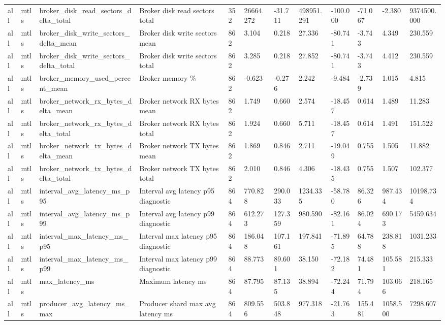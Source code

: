 \begin{longtable}{llllllllllll}
all & mtls & broker\_disk\_read\_sectors\_delta\_total & Broker disk read sectors total & 352 & 26664.272 & -31.711 & 498951.291 & -100.000 & -71.067 & -2.380 & 9374500.000 \\
all & mtls & broker\_disk\_write\_sectors\_delta\_mean & Broker disk write sectors mean & 862 & 3.104 & 0.218 & 27.336 & -80.741 & -3.743 & 4.349 & 230.559 \\
all & mtls & broker\_disk\_write\_sectors\_delta\_total & Broker disk write sectors total & 862 & 3.285 & 0.218 & 27.852 & -80.741 & -3.743 & 4.412 & 230.559 \\
all & mtls & broker\_memory\_used\_percent\_mean & Broker memory \% & 862 & -0.623 & -0.276 & 2.242 & -9.484 & -2.739 & 1.015 & 4.815 \\
all & mtls & broker\_network\_rx\_bytes\_delta\_mean & Broker network RX bytes mean & 862 & 1.749 & 0.660 & 2.574 & -18.457 & 0.614 & 1.489 & 11.283 \\
all & mtls & broker\_network\_rx\_bytes\_delta\_total & Broker network RX bytes total & 862 & 1.924 & 0.660 & 5.711 & -18.457 & 0.614 & 1.491 & 151.522 \\
all & mtls & broker\_network\_tx\_bytes\_delta\_mean & Broker network TX bytes mean & 862 & 1.869 & 0.846 & 2.711 & -19.049 & 0.755 & 1.505 & 11.882 \\
all & mtls & broker\_network\_tx\_bytes\_delta\_total & Broker network TX bytes total & 862 & 2.010 & 0.846 & 4.306 & -18.435 & 0.755 & 1.507 & 102.377 \\
all & mtls & interval\_avg\_latency\_ms\_p95 & Interval avg latency p95 diagnostic & 864 & 770.828 & 290.033 & 1234.335 & -58.780 & 86.326 & 987.434 & 10198.734 \\
all & mtls & interval\_avg\_latency\_ms\_p99 & Interval avg latency p99 diagnostic & 864 & 612.273 & 127.359 & 980.590 & -82.161 & 86.024 & 690.173 & 5459.634 \\
all & mtls & interval\_max\_latency\_ms\_p95 & Interval max latency p95 diagnostic & 864 & 186.048 & 107.161 & 197.841 & -71.895 & 64.788 & 238.818 & 1031.233 \\
all & mtls & interval\_max\_latency\_ms\_p99 & Interval max latency p99 diagnostic & 864 & 88.773 & 89.601 & 38.150 & -72.182 & 74.481 & 105.581 & 215.333 \\
all & mtls & max\_latency\_ms & Maximum latency ms & 864 & 87.795 & 87.135 & 38.894 & -72.244 & 71.794 & 103.066 & 218.165 \\
all & mtls & producer\_avg\_latency\_ms\_max & Producer shard max avg latency ms & 864 & 809.556 & 503.848 & 977.318 & -21.763 & 155.481 & 1058.500 & 7298.607 \\

\end{longtable}
